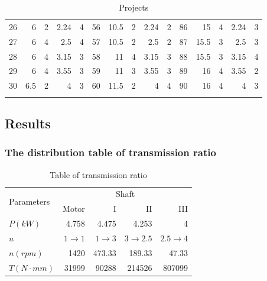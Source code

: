 \begin{center}
\begin{longtable}{C{0.6cm}rrrrC{0.6cm}rrrrC{0.6cm}rrrr}
		{}26&6&2&2.24&4&  {}56&10.5&2&2.24&2&{}86&15&4&2.24&3\\
		27&6&4&2.5&4&   {}57&10.5&2&2.5&2& {}87&15.5&3&2.5&3\\
		{}28&6&4&3.15&3&  {}58&11&4&3.15&3&  {}88&15.5&3&3.15&4\\
		29&6&4&3.55&3&  {}59&11&3&3.55&3&  {}89&16&4&3.55&2\\
		{}30&6.5&2&4&3&   {}60&11.5&2&4&4&   {}90&16&4&4&3\\
		\bottomrule
		\caption{Projects}
		\label{project}
	\end{longtable}
\end{center}

\subsection{Results}
\subsubsection{The distribution table of transmission ratio}
\FloatBarrier
\begin{table}[h!t]
	\centering
	\renewcommand{\arraystretch}{1.5}
	\begin{tabular}{lrrrr}
		\toprule
		\multirow{2}{*}{Parameters} & \multicolumn{4}{c}{Shaft}\\
		\cmidrule{2-5}  &Motor & I & II & III\\\midrule
		$ P\unit{(kW)} $ & 4.758 & 4.475 & 4.253 & 4\\
		$ u $ & $ 1\rightarrow1 $ & $ 1\rightarrow3 $ & $ 3\rightarrow2.5 $ & $ 2.5\rightarrow4 $\\
		$ n\unit{(rpm)} $ & 1420 & 473.33 & 189.33 & 47.33 \\
		$ T\unit{(N\cdot mm)} $ & 31999 & 90288 & 214526 & 807099\\
		\bottomrule
	\end{tabular}
	\caption{Table of transmission ratio}
\end{table}\FloatBarrier
